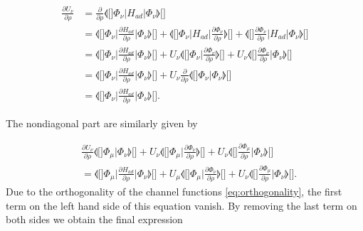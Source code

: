 \begin{align}
\frac{\partial U_{\nu}}{\partial \rho}&=\frac{\partial}{\partial \rho}\llangle[\big]  \Phi_{\nu} \big\lvert H_{ad} \big\rvert  \Phi_{\nu} \rrangle[\big]\nonumber\\
&=\llangle[\Big]  \Phi_{\nu}  \Big\lvert \frac{\partial H_{ad}}{\partial \rho} \Big\rvert  \Phi_{\nu} \rrangle[\Big] +  \llangle[\Big]  \Phi_{\nu} \Big\lvert H_{ad}\Big\rvert  \frac{\partial \Phi_{\nu}}{\partial \rho}  \rrangle[\Big] +\llangle[\Big] \frac{\partial \Phi_{\nu}}{\partial \rho}    \Big\lvert H_{ad}\Big\rvert  \Phi_{\nu}  \rrangle[\Big] \nonumber \\
&=\llangle[\Big]  \Phi_{\nu} \Big\lvert \frac{\partial H_{ad}}{\partial \rho} \Big\rvert  \Phi_{\nu} \rrangle[\Big] + U_{\nu}\llangle[\Big]  \Phi_{\nu} \Big\rvert \frac{\partial \Phi_{\nu}}{\partial \rho}  \rrangle[\Big]+U_{\nu}\llangle[\Big] \frac{\partial \Phi_{\nu}}{\partial \rho}\Big\rvert  \Phi_{\nu} \rrangle[\Big] \nonumber \\
&=\llangle[\Big]  \Phi_{\nu} \Big\lvert \frac{\partial H_{ad}}{\partial \rho} \Big\rvert  \Phi_{\nu} \rrangle[\Big] + U_{\nu} \frac{\partial}{\partial \rho}\llangle[\Big]  \Phi_{\nu} \Big\rvert \Phi_{\nu} \rrangle[\Big] \nonumber \\
&=\llangle[\Big]  \Phi_{\nu}\Big\lvert \frac{\partial H_{ad}}{\partial \rho} \Big\rvert  \Phi_{\nu} \rrangle[\Big].
\end{align}

The nondiagonal part are similarly given by

\begin{align}
&\frac{\partial U_{\nu}}{\partial \rho}\llangle[\Big]  \Phi_{\mu} \Big\lvert \Phi_{\nu} \rrangle[\Big] + U_{\nu}\llangle[\Big]  \Phi_{\mu} \Big\lvert \frac{\partial \Phi_{\nu}}{\partial \rho} \rrangle[\Big]+U_{\nu}\llangle[\Big] \frac{\partial \Phi_{\mu}}{\partial \rho} \Big\lvert \Phi_{\nu} \rrangle[\Big] \nonumber \\
&= \llangle[\Big]  \Phi_{\mu}\Big\lvert \frac{\partial H_{ad}}{\partial \rho} \Big\rvert  \Phi_{\nu} \rrangle[\Big] + U_{\mu}\llangle[\Big]  \Phi_{\mu} \Big\rvert  \frac{\partial \Phi_{\nu}}{\partial \rho}  \rrangle[\Big]+U_{\nu}\llangle[\Big] \frac{\partial \Phi_{\mu}}{\partial \rho}\Big\rvert  \Phi_{\nu} \rrangle[\Big].
\end{align}
Due to the orthogonality of the channel functions \eqref{eq:orthogonality}, the first term on the left hand side of this equation vanish. By removing the last term on both sides we obtain the final expression

